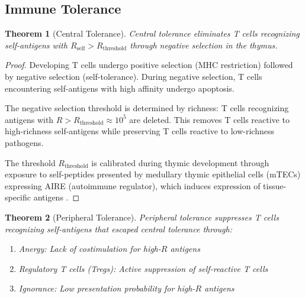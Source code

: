 \documentclass[11pt,twocolumn,a4paper]{article}
\newtheorem{theorem}{Theorem}[section]
\theoremstyle{definition}
\theoremstyle{remark}
\begin{document}
\subsection{Immune Tolerance}

\begin{theorem}[Central Tolerance]
\label{thm:central_tolerance}
Central tolerance eliminates T cells recognizing self-antigens with $R_{\mathrm{self}} > R_{\mathrm{threshold}}$ through negative selection in the thymus.
\end{theorem}

\begin{proof}
Developing T cells undergo positive selection (MHC restriction) followed by negative selection (self-tolerance). During negative selection, T cells encountering self-antigens with high affinity undergo apoptosis.

The negative selection threshold is determined by richness: T cells recognizing antigens with $R > R_{\mathrm{threshold}} \approx 10^5$ are deleted. This removes T cells reactive to high-richness self-antigens while preserving T cells reactive to low-richness pathogens.

The threshold $R_{\mathrm{threshold}}$ is calibrated during thymic development through exposure to self-peptides presented by medullary thymic epithelial cells (mTECs) expressing AIRE (autoimmune regulator), which induces expression of tissue-specific antigens \citep{anderson2002projection}.
\end{proof}

\begin{theorem}[Peripheral Tolerance]
\label{thm:peripheral_tolerance}
Peripheral tolerance suppresses T cells recognizing self-antigens that escaped central tolerance through:
\begin{enumerate}[label=(\alph*)]
\item Anergy: Lack of costimulation for high-$R$ antigens
\item Regulatory T cells (Tregs): Active suppression of self-reactive T cells
\item Ignorance: Low presentation probability for high-$R$ antigens
\end{enumerate}
\end{theorem}
\end{document}

